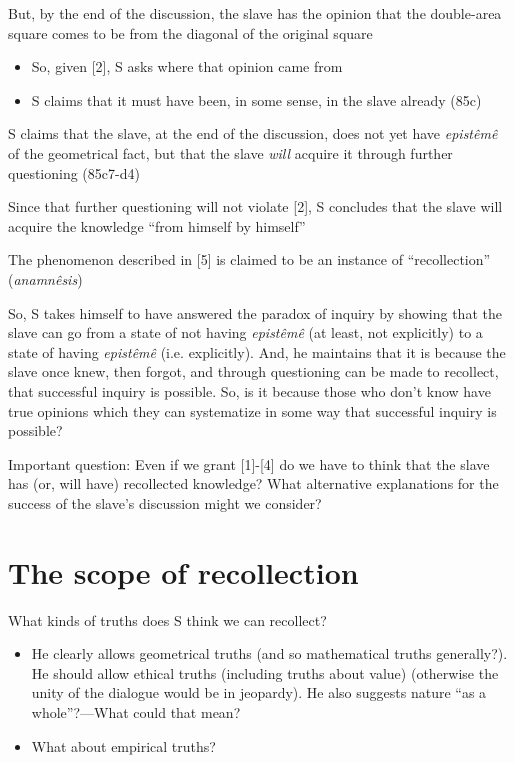 \documentclass[10 pt]{article}
\begin{document}
\noindent [3] But, by the end of the discussion, the slave has the opinion that the double-area square comes to be from the diagonal of the original square

\begin{itemize}\item{So, given [2], S asks where that opinion came from}\item{S claims that it must have been, in some sense, in the slave already (85c)}\end{itemize}

\noindent [4] S claims that the slave, at the end of the discussion, does not yet have \emph{epist\^{e}m\^{e}} of the geometrical fact, but that the slave \emph{will} acquire it through further questioning (85c7-d4)
\vspace*{2mm}

\noindent [5] Since that further questioning will not violate [2], S concludes that the slave will acquire the knowledge ``from himself by himself''
\vspace*{2mm}

\noindent [6] The phenomenon described in [5] is claimed to be an instance of ``recollection'' (\emph{anamn\^{e}sis})
\vspace*{2mm}

\noindent So, S takes himself to have answered the paradox of inquiry by showing that the slave can go from a state of not having \emph{epist\^{e}m\^{e}} (at least, not explicitly) to a state of having \emph{epist\^{e}m\^{e}} (i.e. explicitly). And, he maintains that it is because the slave once knew, then forgot, and through questioning can be made to recollect, that successful inquiry is possible. So, is it because those who don't know have true opinions which they can systematize in some way that successful inquiry is possible?
\vspace*{2mm}

\noindent Important question: Even if we grant [1]-[4] do we have to think that the slave has (or, will have) recollected knowledge? What alternative explanations for the success of the slave's discussion might we consider?

\section*{The scope of recollection}

\noindent What kinds of truths does S think we can recollect?

\begin{itemize}\item{He clearly allows geometrical truths (and so mathematical truths generally?). He should allow ethical truths (including truths about value) (otherwise the unity of the dialogue would be in jeopardy). He also suggests nature ``as a whole''?---What could that mean?}\item{What about empirical truths?}\end{itemize}
\end{document}
